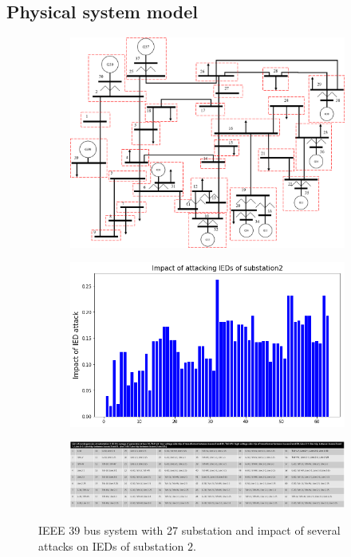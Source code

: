 \subsection{Physical system model}\label{sec:physical}
\begin{figure}[htbp]
	\centering
	\begin{subfigure}{0.23\textwidth}
	\includegraphics[width=\textwidth]{fig-ieee39.png}
	\caption{}\label{sfig:ieee-39}
	\end{subfigure}
	\begin{subfigure}{0.23\textwidth}
	\includegraphics[width=\textwidth]{fig-sub2.png}
	\caption{}\label{sfig:sub-2}
	\end{subfigure}
	\begin{subfigure}{0.46\textwidth}
	\centering
	\includegraphics[width=\textwidth]{fig-key-sub2.png}
	\caption{}
	\label{sfig:key-sub2}
	\end{subfigure}
	\caption{IEEE 39 bus system with 27 substation and impact of several attacks on IEDs of substation $2$.}
	\label{fig:physical}
\end{figure}

